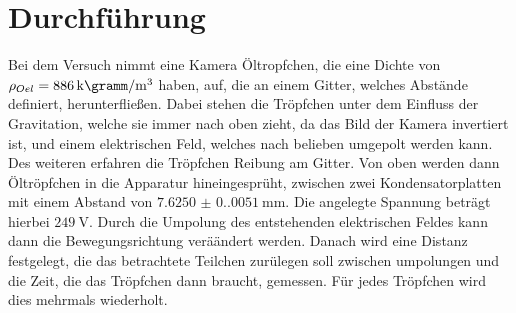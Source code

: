 \section{Durchführung}
Bei dem Versuch nimmt eine Kamera Öltropfchen, die eine Dichte von $\rho_{Oel}=\qty{886}{\kilo\gramm\per\cubic\meter}$ 
haben, auf, die an einem Gitter, welches Abstände definiert, herunterfließen.
Dabei stehen die Tröpfchen unter dem Einfluss der Gravitation, welche sie immer nach oben zieht,
da das Bild der Kamera invertiert ist, und einem elektrischen Feld, welches nach belieben umgepolt werden kann. 
Des weiteren erfahren die Tröpfchen Reibung am Gitter. Von oben werden dann Öltröpfchen in die Apparatur 
hineingesprüht, zwischen zwei Kondensatorplatten mit einem Abstand von $\qty{7.6250(0.0051)}{\milli\meter}$. 
Die angelegte Spannung beträgt hierbei $\qty{249}{\volt}$. Durch die Umpolung des entstehenden elektrischen
Feldes kann dann die Bewegungsrichtung veräändert werden. Danach wird eine Distanz festgelegt, die das betrachtete
Teilchen zurülegen soll zwischen umpolungen und die Zeit, die das Tröpfchen dann braucht, gemessen. Für jedes Tröpfchen
wird dies mehrmals wiederholt.
\label{sec:Durchführung}
